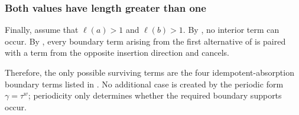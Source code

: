 \documentclass[11pt,a4paper,reqno]{amsart}
\theoremstyle{plain}
\theoremstyle{definition}
\numberwithin{equation}{section}
\begin{document}
	\subsubsection{Both values have length greater than one}
	
	Finally, assume that $\ell(a)>1$ and $\ell(b)>1$.
	By , no interior term can occur.  By
	,
	every boundary term arising from the first alternative of
	 is paired with a term from the opposite
	insertion direction and cancels.
	
	Therefore, the only possible surviving terms are the four
	idempotent-absorption boundary terms listed in
	.  No additional case is created by
	the periodic form $\gamma=\tau^w$; periodicity only determines whether the
	required boundary supports occur.
	
\end{document}
